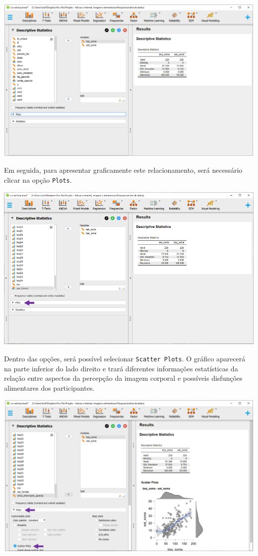 \documentclass[
]{book}
\begin{document}
\includegraphics{./img/cap_correlacao_descritivo3.png}

Em seguida, para apresentar graficamente este relacionamento, será necessário clicar na opção \texttt{Plots}.

\includegraphics{./img/cap_correlacao_plot.png}

Dentro das opções, será possível selecionar \texttt{Scatter\ Plots}. O gráfico aparecerá na parte inferior do lado direito e trará diferentes informações estatísticas da relação entre aspectos da percepção da imagem corporal e possíveis disfunções alimentares dos participantes.

\includegraphics{./img/cap_correlacao_grafico_dispersao.png}
\end{document}

